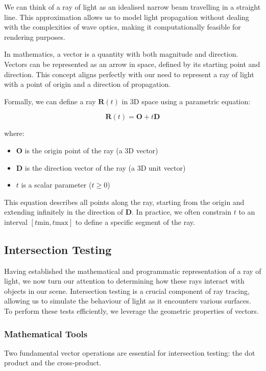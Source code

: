 \documentclass[12pt]{article}
\begin{document}
We can think of a ray of light as an idealised narrow beam travelling in a straight line. This approximation allows us to model light propagation without dealing with the complexities of wave optics, making it computationally feasible for rendering purposes.

In mathematics, a vector is a quantity with both magnitude and direction. Vectors can be represented as an arrow in space, defined by its starting point and direction. This concept aligns perfectly with our need to represent a ray of light with a point of origin and a direction of propagation.

Formally, we can define a ray \(\mathbf{R}(t)\) in 3D space using a parametric equation:

\[
    \mathbf{R}(t) = \mathbf{O} + t\mathbf{D}
\]

where:
\begin{itemize}
    \item \(\mathbf{O}\) is the origin point of the ray (a 3D vector)
    \item \(\mathbf{D}\) is the direction vector of the ray (a 3D unit vector)
    \item \(t\) is a scalar parameter (\(t \geq 0\))
\end{itemize}

This equation describes all points along the ray, starting from the origin and extending infinitely in the direction of \(\mathbf{D}\). In practice, we often constrain \(t\) to an interval \([t{\text{min}}, t{\text{max}}]\) to define a specific segment of the ray.

\subsection{Intersection Testing}

Having established the mathematical and programmatic representation of a ray of light, we now turn our attention to determining how these rays interact with objects in our scene. Intersection testing is a crucial component of ray tracing, allowing us to simulate the behaviour of light as it encounters various surfaces. To perform these tests efficiently, we leverage the geometric properties of vectors.

\subsubsection{Mathematical Tools}

Two fundamental vector operations are essential for intersection testing: the dot product and the cross-product.
\end{document}
